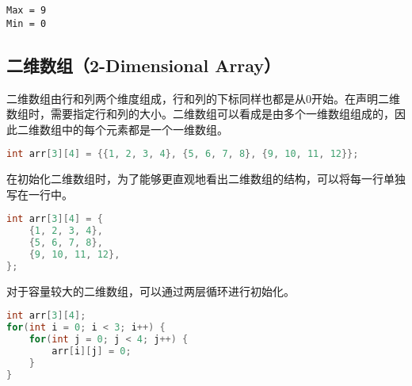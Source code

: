 \begin{tcolorbox}
	\begin{verbatim}
Max = 9
Min = 0
	\end{verbatim}
\end{tcolorbox}

\vspace{0.5cm}

\subsection{二维数组（2-Dimensional Array）}

二维数组由行和列两个维度组成，行和列的下标同样也都是从0开始。在声明二维数组时，需要指定行和列的大小。二维数组可以看成是由多个一维数组组成的，因此二维数组中的每个元素都是一个一维数组。

\vspace{-0.5cm}

\begin{lstlisting}[language=C]
int arr[3][4] = {{1, 2, 3, 4}, {5, 6, 7, 8}, {9, 10, 11, 12}};
\end{lstlisting}

\begin{table}[H]
	\centering
\end{table}

在初始化二维数组时，为了能够更直观地看出二维数组的结构，可以将每一行单独写在一行中。

\vspace{-0.5cm}

\begin{lstlisting}[language=C]
int arr[3][4] = {
	{1, 2, 3, 4},
	{5, 6, 7, 8},
	{9, 10, 11, 12},
};
\end{lstlisting}

对于容量较大的二维数组，可以通过两层循环进行初始化。

\vspace{-0.5cm}

\begin{lstlisting}[language=C]
int arr[3][4];
for(int i = 0; i < 3; i++) {
	for(int j = 0; j < 4; j++) {
		arr[i][j] = 0;
	}
}
\end{lstlisting}

